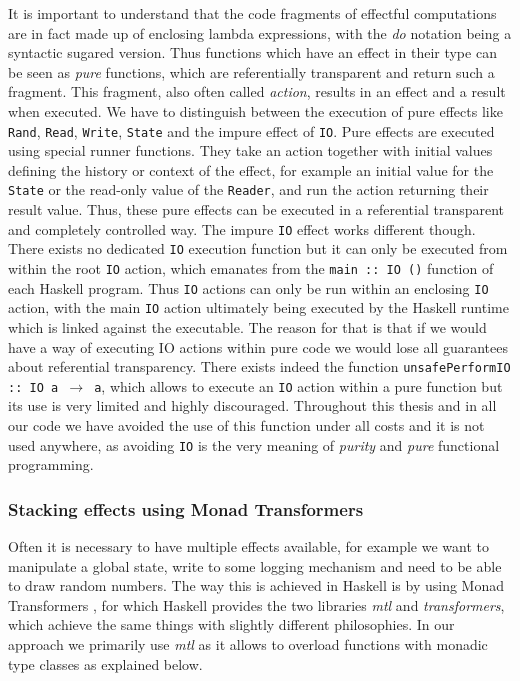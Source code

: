 It is important to understand that the code fragments of effectful computations are in fact  made up of enclosing lambda expressions, with the \textit{do} notation being a syntactic sugared version. Thus functions which have an effect in their type can be seen as \textit{pure} functions, which are referentially transparent and return such a fragment. This fragment, also often called \textit{action}, results in an effect and a result when executed. We have to distinguish between the execution of pure effects like \texttt{Rand}, \texttt{Read}, \texttt{Write}, \texttt{State} and the impure effect of \texttt{IO}. Pure effects are executed using special runner functions. They take an action together with initial values defining the history or context of the effect, for example an initial value for the \texttt{State} or the read-only value of the \texttt{Reader}, and run the action returning their result value. Thus, these pure effects can be executed in a referential transparent and completely controlled way. The impure \texttt{IO} effect works different though. There exists no dedicated \texttt{IO} execution function but it can only be executed from within the root \texttt{IO} action, which emanates from the \texttt{main :: IO ()} function of each Haskell program. Thus \texttt{IO} actions can only be run within an enclosing \texttt{IO} action, with the main \texttt{IO} action ultimately being executed by the Haskell runtime which is linked against the executable. The reason for that is that if we would have a way of executing IO actions within pure code we would lose all guarantees about referential transparency. There exists indeed the function \texttt{unsafePerformIO :: IO a $\rightarrow$ a}, which allows to execute an \texttt{IO} action within a pure function but its use is very limited and highly discouraged. Throughout this thesis and in all our code we have avoided the use of this function under all costs and it is not used anywhere, as avoiding \texttt{IO} is the very meaning of \textit{purity} and \textit{pure} functional programming.

\subsubsection{Stacking effects using Monad Transformers}
Often it is necessary to have multiple effects available, for example we want to manipulate a global state, write to some logging mechanism and need to be able to draw random numbers. The way this is achieved in Haskell is by using Monad Transformers \cite{jones_functional_1995}, for which Haskell provides the two libraries \textit{mtl} and \textit{transformers}, which achieve the same things with slightly different philosophies. In our approach we primarily use \textit{mtl} as it allows to overload functions with monadic type classes as explained below.

